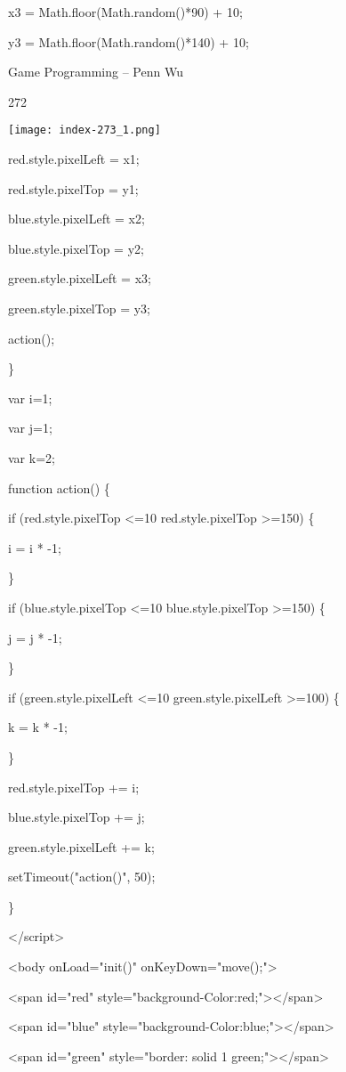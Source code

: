 \documentclass[
]{article}
\begin{document}
x3 = Math.floor(Math.random()*90) + 10;

y3 = Math.floor(Math.random()*140) + 10;

Game Programming -- Penn Wu

272

\protect\hypertarget{index_split_014.htmlux5cux23p273}{}{}\texttt{[image: index-273\_1.png]}

red.style.pixelLeft = x1;

red.style.pixelTop = y1;

blue.style.pixelLeft = x2;

blue.style.pixelTop = y2;

green.style.pixelLeft = x3;

green.style.pixelTop = y3;

action();

\}

var i=1;

var j=1;

var k=2;

function action() \{

if (red.style.pixelTop \textless=10 \textbar\textbar{}
red.style.pixelTop \textgreater=150) \{

i = i * -1;

\}

if (blue.style.pixelTop \textless=10 \textbar\textbar{}
blue.style.pixelTop \textgreater=150) \{

j = j * -1;

\}

if (green.style.pixelLeft \textless=10 \textbar\textbar{}
green.style.pixelLeft \textgreater=100) \{

k = k * -1;

\}

red.style.pixelTop += i;

blue.style.pixelTop += j;

green.style.pixelLeft += k;

setTimeout("action()", 50);

\}

\textless/script\textgreater{}

\textless body onLoad="init()" onKeyDown="move();"\textgreater{}

\textless span id="red"
style="background-Color:red;"\textgreater\textless/span\textgreater{}

\textless span id="blue"
style="background-Color:blue;"\textgreater\textless/span\textgreater{}

\textless span id="green" style="border: solid 1
green;"\textgreater\textless/span\textgreater{}
\end{document}
